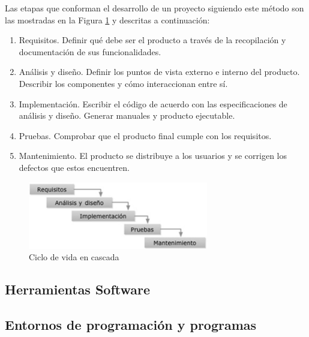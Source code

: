 Las etapas que conforman el desarrollo de un proyecto siguiendo este método son las mostradas en la Figura \ref{fig:cicloCascada} y descritas \cite{pradel2013ingenieria} a continuación:
\begin{enumerate}
    \item Requisitos. Definir qué debe ser el producto a través de la recopilación y documentación de sus funcionalidades.
    \item Análisis y diseño. Definir los puntos de vista externo e interno del producto. Describir los componentes y cómo interaccionan entre sí.
    \item Implementación. Escribir el código de acuerdo con las especificaciones de análisis y diseño. Generar manuales y producto ejecutable.
    \item Pruebas. Comprobar que el producto final cumple con los requisitos.
    \item Mantenimiento. El producto se distribuye a los usuarios y se corrigen los defectos que estos encuentren.
\end{enumerate}

\begin{figure}[h]
    \centering
    \includegraphics[width=0.7\textwidth]{img/4.TecnicasHerramientas/Cascada.png}
    \caption{Ciclo de vida en cascada \cite{pradel2013ingenieria}}
    \label{fig:cicloCascada}
\end{figure}


\subsection{Herramientas Software}



\subsection{Entornos de programación y programas}

